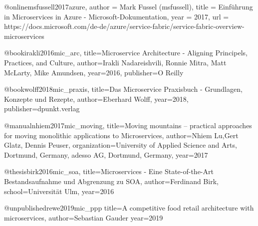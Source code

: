 @online{msfussell2017azure,
  author = {Mark Fussel (msfussell)},
  title = {Einf{\"u}hrung in Microservices in Azure - Microsoft-Dokumentation},
  year = {2017},
  url = {https://docs.microsoft.com/de-de/azure/service-fabric/service-fabric-overview-microservices}
}

@book{irakli2016mic_arc,
  title={Microservice Architecture - Aligning Principels, Practices, and Culture},
  author={Irakli Nadareishvili, Ronnie Mitra, Matt McLarty, Mike Amundsen},
  year={2016},
  publisher={O Reilly}
}

@book{wolff2018mic_praxis,
  title={Das Microservice Praxisbuch - Grundlagen, Konzepte und Rezepte},
  author={Eberhard Wolff},
  year={2018},
  publisher={dpunkt.verlag}
}

@manual{nhiem2017mic_moving,
	title={Moving mountains – practical approaches for
	moving monolithic applications to Microservices},
	author={Nhiem Lu,Gert Glatz, Dennis Peuser},
	organization={University of Applied Science and Arts, Dortmund, Germany, adesso AG, Dortmund, Germany},
	year={2017}
}

@thesis{birk2016mic_soa,
	title={Microservices - Eine State-of-the-Art Bestandsaufnahme
	und Abgrenzung zu SOA},
	author={Ferdinand Birk},
	school={Universität Ulm},
	year={2016}
}

@unpublished{rewe2019mic_ppp
	title={A competitive food retail architecture with microservices},
	author={Sebastian Gauder}
	year={2019}
}